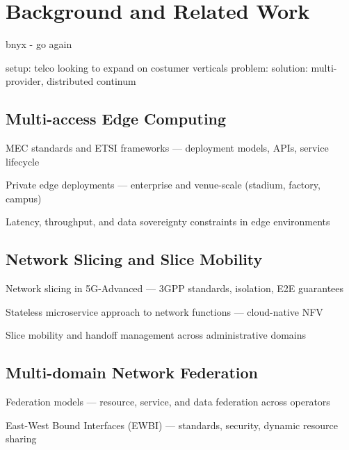 \chapter{Background and Related Work}
\label{chap:background-related-work}

\begin{introduction}
bnyx - go again
\end{introduction}

setup: telco looking to expand on costumer verticals 
problem: 
solution: multi-provider, distributed continum


\section{Multi-access Edge Computing}


MEC standards and ETSI frameworks — deployment models, APIs, service lifecycle

Private edge deployments — enterprise and venue-scale (stadium, factory, campus)

Latency, throughput, and data sovereignty constraints in edge environments

\section{Network Slicing and Slice Mobility}

Network slicing in 5G-Advanced — 3GPP standards, isolation, E2E guarantees

Stateless microservice approach to network functions — cloud-native NFV

Slice mobility and handoff management across administrative domains

\section{Multi-domain Network Federation}

Federation models — resource, service, and data federation across operators

East-West Bound Interfaces (EWBI) — standards, security, dynamic resource sharing

